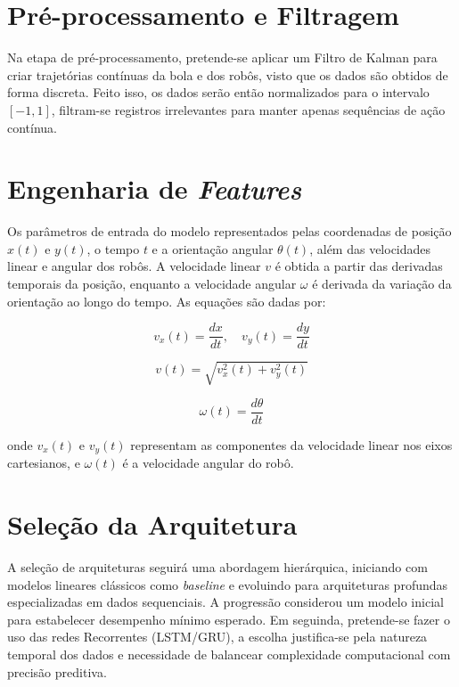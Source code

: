 \section{Pré-processamento e Filtragem} 

Na etapa de pré-processamento, pretende-se aplicar um Filtro de Kalman para criar trajetórias contínuas da bola e dos robôs, visto que os dados são obtidos de forma discreta. Feito isso, os dados serão então normalizados para o intervalo \([-1, 1]\), filtram-se registros irrelevantes para manter apenas sequências de ação contínua.  


\section{Engenharia de \textit{Features}} 

Os parâmetros de entrada do modelo representados pelas coordenadas de posição \( x(t) \) e \( y(t) \), o tempo \( t \) e a orientação angular \( \theta(t) \), além das velocidades linear e angular dos robôs. A velocidade linear \( v \) é obtida a partir das derivadas temporais da posição, enquanto a velocidade angular \( \omega \) é derivada da variação da orientação ao longo do tempo. As equações são dadas por:

\begin{equation}
    v_x(t) = \frac{dx}{dt}, \quad v_y(t) = \frac{dy}{dt}
\end{equation}

\begin{equation}
    v(t) = \sqrt{v_x^2(t) + v_y^2(t)}
\end{equation}

\begin{equation}
    \omega(t) = \frac{d\theta}{dt}
\end{equation}

onde \( v_x(t) \) e \( v_y(t) \) representam as componentes da velocidade linear nos eixos cartesianos, e \( \omega(t) \) é a velocidade angular do robô.  
  


\section{Seleção da Arquitetura}

A seleção de arquiteturas seguirá uma abordagem hierárquica, iniciando com modelos lineares clássicos como \textit{baseline} e evoluindo para arquiteturas profundas especializadas em dados sequenciais. A progressão considerou um modelo inicial para estabelecer desempenho mínimo esperado. Em seguinda, pretende-se fazer o uso das redes Recorrentes (LSTM/GRU), a escolha justifica-se pela natureza temporal dos dados e necessidade de balancear complexidade computacional com precisão preditiva.  


